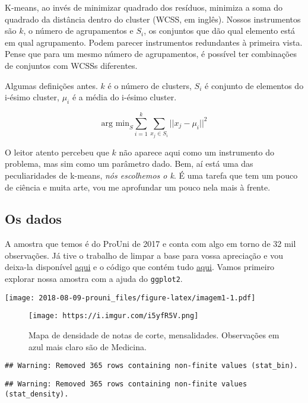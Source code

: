 \documentclass[]{article}
\begin{document}
K-means, ao invés de minimizar quadrado dos resíduos, minimiza a soma do
quadrado da distância dentro do cluster (WCSS, em inglês). Nossos
instrumentos são \(k\), o número de agrupamentos e \(S_i\), os conjuntos
que dão qual elemento está em qual agrupamento. Podem parecer
instrumentos redundantes à primeira vista. Pense que para um mesmo
número de agrupamentos, é possível ter combinações de conjuntos com
WCSSs diferentes.

Algumas definições antes. \(k\) é o número de clusters, \(S_i\) é
conjunto de elementos do i-ésimo cluster, \(\mu_i\) é a média do i-ésimo
cluster.

\[ \text{arg min}_S \sum_{i=1}^k \sum_{x_j \in S_i} || x_j - \mu_i ||^2 \]

O leitor atento percebeu que \(k\) não aparece aqui como um instrumento
do problema, mas sim como um parâmetro dado. Bem, aí está uma das
peculiaridades de k-means, \emph{nós escolhemos o k}. É uma tarefa que
tem um pouco de ciência e muita arte, vou me aprofundar um pouco nela
mais à frente.

\subsection{Os dados}\label{os-dados}

A amostra que temos é do ProUni de 2017 e conta com algo em torno de 32
mil observações. Já tive o trabalho de limpar a base para vossa
apreciação e vou deixa-la disponível
\href{https://github.com/danmrc/azul/tree/master/content/post/ProUni}{aqui}
e o código que contém tudo
\href{https://github.com/danmrc/azul/blob/master/content/post/ProUni/prouni_cluster.R}{aqui}.
Vamos primeiro explorar nossa amostra com a ajuda do \texttt{ggplot2}.

\texttt{[image: 2018-08-09-prouni\_files/figure-latex/imagem1-1.pdf]}

\begin{figure}
\centering
\texttt{[image: https://i.imgur.com/i5yfR5V.png]}
\caption{Mapa de densidade de notas de corte, mensalidades. Observações
em azul mais claro são de Medicina.}
\end{figure}

\begin{verbatim}
## Warning: Removed 365 rows containing non-finite values (stat_bin).
\end{verbatim}

\begin{verbatim}
## Warning: Removed 365 rows containing non-finite values (stat_density).
\end{verbatim}
\end{document}
